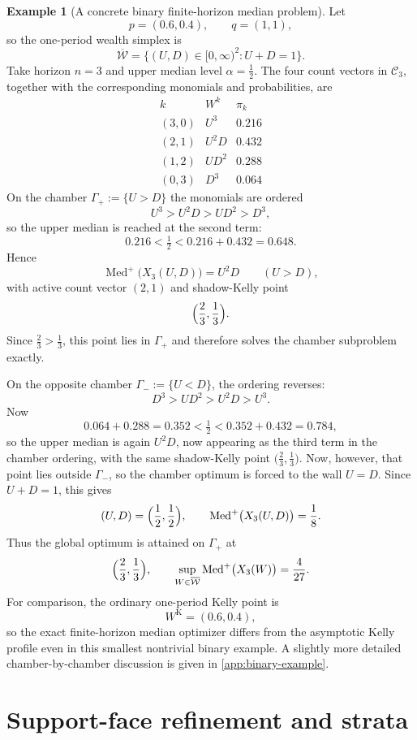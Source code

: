 \documentclass[11pt]{article}
\theoremstyle{definition}
\newtheorem{example}[example]{Example}
\newcommand{\1}{\mathbf{1}}
\newcommand{\Med}{\operatorname{Med}}
\begin{document}
\begin{example}[A concrete binary finite-horizon median problem]\label{ex:binary-main}
Let
\[
p=(0.6,0.4),\qquad q=(1,1),
\]
so the one-period wealth simplex is
\[
\overline{\mathcal W}=\{(U,D)\in[0,\infty)^2: U+D=1\}.
\]
Take horizon $n=3$ and upper median level $\alpha=\tfrac12$. The four count vectors in $\mathcal C_3$, together with the corresponding monomials and probabilities, are
\[
\begin{array}{c|c|c}
k & W^k & \pi_k \\ \hline
(3,0) & U^3 & 0.216 \\
(2,1) & U^2D & 0.432 \\
(1,2) & UD^2 & 0.288 \\
(0,3) & D^3 & 0.064
\end{array}
\]
On the chamber $\Gamma_+:=\{U>D\}$ the monomials are ordered
\[
U^3>U^2D>UD^2>D^3,
\]
so the upper median is reached at the second term:
\[
0.216<\tfrac12<0.216+0.432=0.648.
\]
Hence
\[
\Med^+\bigl(X_3(U,D)\bigr)=U^2D
\qquad (U>D),
\]
with active count vector $(2,1)$ and shadow-Kelly point
\[
\Bigl(\frac23,\frac13\Bigr).
\]
Since $\frac23>\frac13$, this point lies in $\Gamma_+$ and therefore solves the chamber subproblem exactly.

On the opposite chamber $\Gamma_-:=\{U<D\}$, the ordering reverses:
\[
D^3>UD^2>U^2D>U^3.
\]
Now
\[
0.064+0.288=0.352<\tfrac12<0.352+0.432=0.784,
\]
so the upper median is again $U^2D$, now appearing as the third term in the chamber ordering, with the same shadow-Kelly point $\bigl(\frac23,\frac13\bigr)$. Now, however, that point lies outside $\Gamma_-$, so the chamber optimum is forced to the wall $U=D$. Since $U+D=1$, this gives
\[
(U,D)=\Bigl(\frac12,\frac12\Bigr),
\qquad
\Med^+\bigl(X_3(U,D)\bigr)=\frac18.
\]
Thus the global optimum is attained on $\Gamma_+$ at
\[
\Bigl(\frac23,\frac13\Bigr),
\qquad
\sup_{W\in\overline{\mathcal W}}\Med^+\bigl(X_3(W)\bigr)=\frac{4}{27}.
\]
For comparison, the ordinary one-period Kelly point is
\[
W^{\mathrm K}=(0.6,0.4),
\]
so the exact finite-horizon median optimizer differs from the asymptotic Kelly profile even in this smallest nontrivial binary example. A slightly more detailed chamber-by-chamber discussion is given in \cref{app:binary-example}.
\end{example}

\section{Support-face refinement and strata}\label{sec:support-strata}
\end{document}
